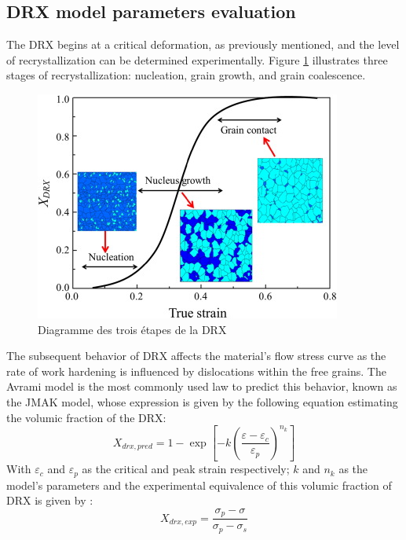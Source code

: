 \documentclass[metals,article,submit,pdftex,moreauthors]{Definitions/mdpi}
\begin{document}
\subsection{DRX model parameters evaluation\label{subsec:DRXparams}}
The DRX begins at a critical deformation, as previously mentioned, and the level of recrystallization can be determined experimentally.
Figure \ref{fig:DRXschema} illustrates three stages of recrystallization: nucleation, grain growth, and grain coalescence.
\begin{figure}[!ht]
\includegraphics[width=0.7\columnwidth]{Figures/picDRX}
\caption[Diagramme des trois étapes de la DRX]{Diagramme des trois étapes de la DRX \cite{wan2017experimental}}
\label{fig:DRXschema}
\end{figure}
The subsequent behavior of DRX affects the material's flow stress curve as the rate of work hardening is influenced by dislocations within the free grains.
The Avrami model is the most commonly used law to predict this behavior, known as the JMAK model, whose expression is given by the following equation estimating the volumic fraction of the DRX:
\begin{equation}
X_{drx,pred} = 1 - \exp\left[ -k\left(\frac{\varepsilon - \varepsilon_c}{\varepsilon_p}\right)^{n_k}\right]
\label{eq:drxpred}
\end{equation}
With $\varepsilon_c$ and $\varepsilon_p$ as the critical and peak strain respectively; $k$ and $n_k$ as the model's parameters and the experimental equivalence of this volumic fraction of DRX is given by :
\begin{equation}
X_{drx,exp} = \frac{\sigma_p-\sigma}{\sigma_p-\sigma_{s}}
\label{eq:drxexp}
\end{equation}
\end{document}
